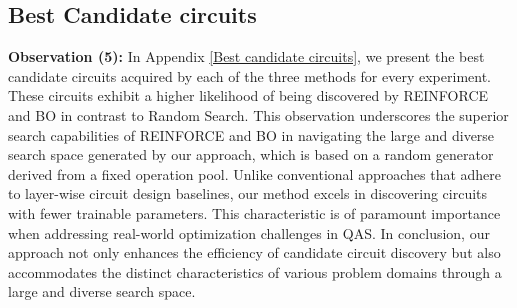 \documentclass{article} %
\begin{document}
\subsection{Best Candidate circuits}
\textbf{Observation (5):} In Appendix \ref{Best candidate circuits}, we present the best candidate circuits acquired by each of the three methods for every experiment. These circuits exhibit a higher likelihood of being discovered by REINFORCE and BO in contrast to Random Search. This observation underscores the superior search capabilities of REINFORCE and BO in navigating the large and diverse search space generated by our approach, which is based on a random generator derived from a fixed operation pool. Unlike conventional approaches that adhere to layer-wise circuit design baselines, our method excels in discovering circuits with fewer trainable parameters. This characteristic is of paramount importance when addressing real-world optimization challenges in QAS. In conclusion, our approach not only enhances the efficiency of candidate circuit discovery but also accommodates the distinct characteristics of various problem domains through a large and diverse search space.
\label{Best candidate circuits}
\end{document}
